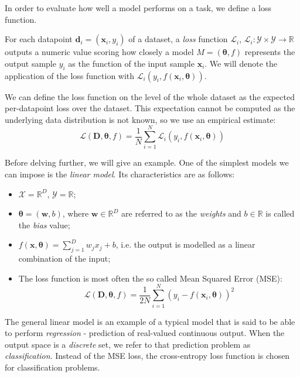 In order to evaluate how well a model performs on a task, we define a loss function.

\begin{definition}
For each datapoint $\pmb{d}_i=(\pmb{x}_i, y_i)$ of a dataset, a \emph{loss} function $\mathcal{L}_{i}$, $\mathcal{L}_{i}: \mathcal{Y} \times \mathcal{Y} \to \mathbb{R} $ outputs a numeric value scoring how closely a model $M = (\pmb{\theta}, f)$ represents the output sample $y_i$ as the function of the input sample $\pmb{x}_i$. We will denote the application of the loss function with $\mathcal{L}_{i}(y_i, f(\pmb{x}_i, \pmb{\theta}))$.

We can define the loss function on the level of the whole dataset as the expected per-datapoint loss over the dataset. This expectation cannot be computed as the underlying data distribution is not known, so we use an empirical estimate: \begin{equation}
\mathcal{L}(\pmb{D}, \pmb{\theta}, f) = \frac{1}{N}\sum_{i=1}^{N}{\mathcal{L}_{i}(y_i, f(\pmb{x}_i, \pmb{\theta}))}
\end{equation}
\end{definition}

Before delving further, we will give an example. One of the simplest models we can impose is the \emph{linear model}. Its characteristics are as follows:
\begin{itemize}
\item $\mathcal{X} = \mathbb{R}^D$, $\mathcal{Y}=\mathbb{R}$;
\item $\pmb{\theta} = (\pmb{w}, b)$, where $\pmb{w} \in \mathbb{R}^D$ are referred to as the \emph{weights} and $b \in \mathbb{R}$ is called the \emph{bias} value;
\item $f(\pmb{x}, \pmb{\theta}) = \sum_{j=1}^{D}{w_j x_j} + b$, i.e. the output is modelled as a linear combination of the input;
\item The loss function is most often the so called Mean Squared Error (MSE): \begin{equation}
\mathcal{L}(\pmb{D}, \pmb{\theta}, f) = \frac{1}{2N}\sum_{i=1}^{N}{(y_i - f(\pmb{x}_i, \pmb{\theta}))^2}
\end{equation}
\end{itemize}

The general linear model is an example of a typical model that is said to be able to perform \emph{regression} - prediction of real-valued continuous output. When the output space is a \emph{discrete} set, we refer to that prediction problem as \emph{classification}. Instead of the MSE loss, the cross-entropy loss function is chosen for classification problems.

